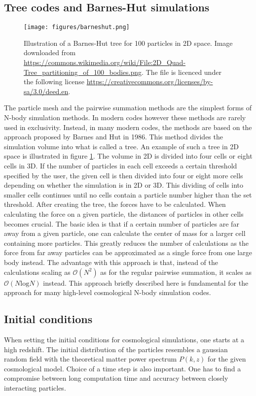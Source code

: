 \subsection{Tree codes and Barnes-Hut simulations}\label{sec:barneshut}
\begin{figure}
    \texttt{[image: figures/barneshut.png]}
    \caption{Illustration of a Barnes-Hut tree for 100 particles in 2D space. Image downloaded from \url{https://commons.wikimedia.org/wiki/File:2D_Quad-Tree_partitioning_of_100_bodies.png}.
    The file is licenced under the following license \url{https://creativecommons.org/licenses/by-sa/3.0/deed.en}.}
    \label{fig:barneshut}
\end{figure}
The particle mesh and the pairwise summation methods are the simplest forms of N-body simulation methods.
In modern codes however these methods are rarely used in exclusivity. Instead, in many modern codes, the methods are based on the approach proposed
by Barnes and Hut in 1986\cite{Barneshut}. This method divides the simulation volume into what is called a tree. An example of such a tree in 2D space is 
illustrated in figure \ref{fig:barneshut}. The volume in 2D is divided into four cells or eight cells in 3D. If the number of particles in each cell exceeds a certain
threshold specified by the user, the given cell is then divided into four or eight more cells depending on whether the simulation is in 2D or 3D. This dividing of cells
into smaller cells continues until no cells contain a particle number higher than the set threshold. After creating the tree, the forces have to be calculated. When calculating
the force on a given particle, the distances of particles in other cells becomes crucial. The basic idea is that if a certain number of particles are far away from a given particle,
one can calculate the center of mass for a larger cell containing more particles. This greatly reduces the number of calculations as the force from far away particles can be approximated
as a single force from one large body instead. The advantage with this approach is that, instead of the calculations scaling as $\mathcal{O}(N^2)$ as for the regular pairwise summation,
it scales as $\mathcal{O}(N\mathrm{log}N)$ instead. This approach briefly described here is fundamental for the approach for many high-level cosmological N-body simulation codes.

\subsection{Initial conditions}
When setting the initial conditions for cosmological simulations, one starts at
a high redshift. The initial distribution of the particles resembles a gaussian
random field with the theoretical matter power spectrum $P(k,z)$ for the given
cosmological model. Choice of a time step is also important. One has to find a
compromise between long computation time and accuracy between closely
interacting particles. 

